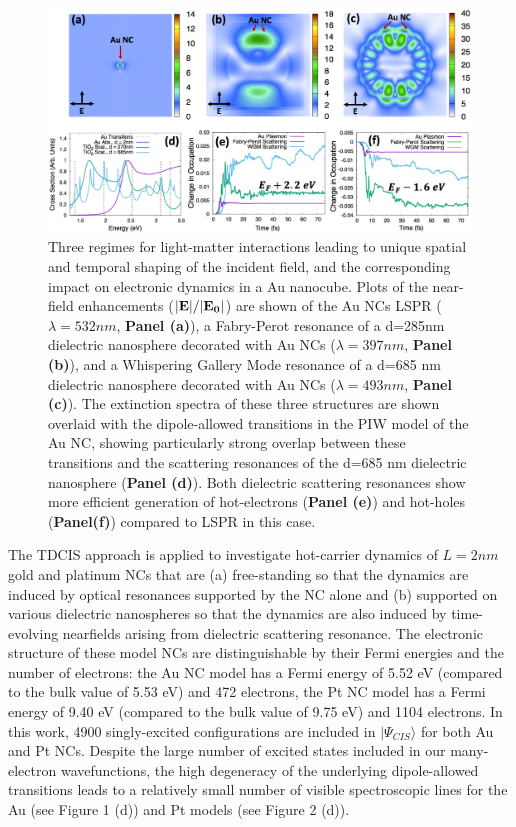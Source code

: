 \documentclass[journal=jpclcd,manuscript=letter]{achemso}
\begin{document}
\begin{figure}
\begin{center}
\includegraphics[width=6in]{figs/Au_AllThree_Alternate.png}
\caption{Three regimes for light-matter interactions leading to unique
spatial and temporal shaping of the incident field, and the corresponding
impact on electronic dynamics in a Au nanocube. Plots of the near-field enhancements (${\bf |E|}/{\bf |E_0|}$) are shown of the
Au NCs LSPR ($\lambda=532 nm$, {\bf Panel (a)}), a Fabry-Perot resonance of a d=285nm dielectric nanosphere decorated with Au NCs ($\lambda = 397 nm$, {\bf Panel (b)}),
and a Whispering Gallery Mode resonance of a d=685 nm dielectric nanosphere decorated with Au NCs ($\lambda = 493 nm$, {\bf Panel (c)}).
The extinction spectra of these three structures are shown overlaid with the dipole-allowed transitions in the PIW model of the Au NC, showing particularly
strong overlap between these transitions and the scattering resonances of the d=685 nm dielectric nanosphere ({\bf Panel (d)}).
Both dielectric scattering resonances show more efficient generation of hot-electrons ({\bf Panel (e)}) and hot-holes ({\bf Panel(f)}) compared to LSPR in this case.}
\end{center}
\end{figure}

The TDCIS approach is applied to investigate hot-carrier dynamics of $L=2nm$ gold and platinum NCs that are (a) free-standing so that
the dynamics are induced by optical resonances supported by the NC alone and (b) supported on various dielectric nanospheres so
that the dynamics are also induced by time-evolving nearfields arising from dielectric scattering resonance.
The electronic structure
of these model NCs are distinguishable by their Fermi energies and the number of electrons: the Au NC model has a Fermi energy
of 5.52 eV (compared to the bulk value of 5.53 eV) and 472 electrons, the Pt NC model has a Fermi energy of 9.40 eV (compared to the bulk
value of 9.75 eV) and 1104 electrons. 
In this work, 4900 singly-excited configurations are included in $|\Psi_{CIS}\rangle$ for both Au and Pt NCs.  
Despite the large number of excited states included in our many-electron wavefunctions, the high 
degeneracy of the underlying dipole-allowed transitions leads to a relatively small number of visible spectroscopic lines for the Au (see Figure 1 (d))
and Pt models (see Figure 2 (d)). 
\end{document}
